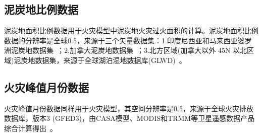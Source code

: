 \subsection{泥炭地比例数据}\label{泥炭地比例数据}
泥炭地面积比例数据用于火灾模型中泥炭地火灾过火面积的计算。泥炭地面积比例数据的分辨率是全球0.5\textdegree，来源于三个矢量数据集：1.印度尼西亚和马来西亚婆罗洲泥炭地数据集~\citep{olson2001terrestrial}；2.加拿大泥炭地数据集~\citep{tarnocai2000peatlands}；3.北方区域(加拿大以外 45\textdegree N 以北区域)泥炭地数据集，来源于全球湖泊湿地数据库(GLWD)~\citep{lehner2004development}。


\subsection{火灾峰值月份数据}\label{火灾峰值月份数据}
火灾峰值月份数据同样用于火灾模型，其空间分辨率是0.5\textdegree，来源于全球火灾排放数据库，版本3 (GFED3)，由CASA模型、MODIS和TRMM等卫星遥感数据产品综合计算得出~\citep{van2010global}。


